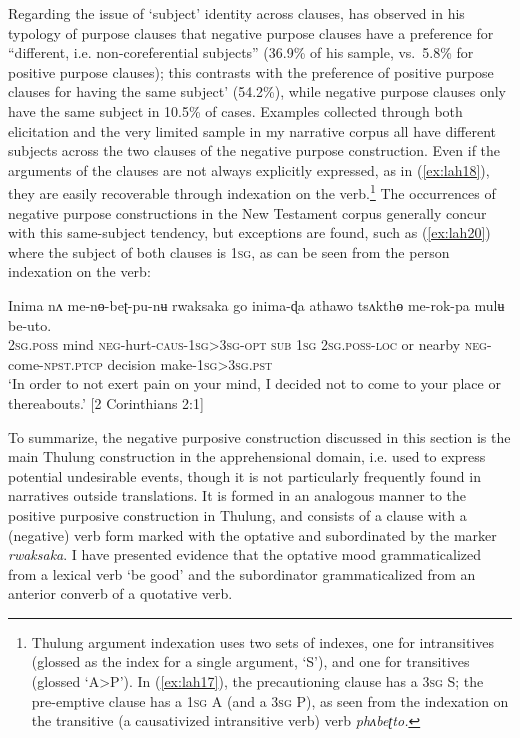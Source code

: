 \documentclass[output=paper,colorlinks,citecolor=brown,
]{langscibook}
\begin{document}
Regarding the issue of `subject' identity across clauses, \citet[133]{Schmidtke-Bode2009} has observed in his typology of purpose clauses that negative purpose clauses have a preference for ``different, i.e. non-coreferential subjects'' (36.9\% of his sample, vs.\ 5.8\% for positive purpose clauses); this contrasts with the preference of positive purpose clauses for having the same subject' (54.2\%), while negative purpose clauses only have the same subject in 10.5\% of cases. Examples collected through both elicitation and the very limited sample in my narrative corpus all have different subjects across the two clauses of the negative purpose construction. Even if the arguments of the clauses are not always explicitly expressed, as in (\ref{ex:lah18}), they are easily recoverable through indexation on the verb.\footnote{Thulung argument indexation uses two sets of indexes, one for intransitives (glossed as the index for a single argument, `S'), and one for transitives (glossed `A>P'). In (\ref{ex:lah17}), the precautioning clause has a \textsc{3sg} S; the pre-emptive clause has a \textsc{1sg} A (and a \textsc{3sg} P), as seen from the indexation on the transitive (a causativized intransitive verb) verb \textit{phʌbeʈto.}} The occurrences of negative purpose constructions in the New Testament corpus generally concur with this same-subject tendency, but exceptions are found, such as (\ref{ex:lah20}) where the subject of both clauses is \textsc{1sg}, as can be seen from the person indexation on the verb:

\ea \label{ex:lah20}
\gll Inima nʌ me-nɵ-beʈ-pu-nʉ rwaksaka go inima-ɖa athawo tsʌkthɵ me-rok-pa mulʉ be-uto. \\
\textsc{2sg.poss} mind \textsc{neg}-hurt-\textsc{caus-1sg>3sg-opt} \textsc{sub}  \textsc{1sg} \textsc{2sg.poss-loc} or nearby \textsc{neg}-come-\textsc{npst.ptcp} decision make-\textsc{1sg>3sg.pst} \\
\glt 
`In order to not exert pain on your mind, I decided not to come to your place or  thereabouts.' [2 Corinthians 2:1]
\z

To summarize, the negative purposive construction discussed in this section is the main Thulung construction in the apprehensional domain, i.e. used to express potential undesirable events, though it is not particularly frequently found in narratives outside translations. It is formed in an analogous manner to the positive purposive construction in Thulung, and consists of a clause with a (negative) verb form marked with the optative and subordinated by the marker \textit{rwaksaka}. I have presented evidence that the optative mood grammaticalized from a lexical verb `be good' and the subordinator grammaticalized from an anterior converb of a quotative verb.
\end{document}
